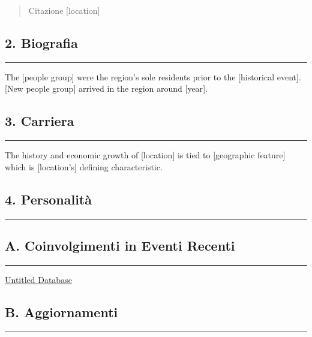 \begin{quote}
Citazione {[}location{]}
\end{quote}

\subsection{2. Biografia}\label{biografia}

\begin{center}\rule{0.5\linewidth}{0.5pt}\end{center}

The {[}people group{]} were the region's sole residents prior to the
{[}historical event{]}. {[}New people group{]} arrived in the region
around {[}year{]}.

\subsection{3. Carriera}\label{carriera}

\begin{center}\rule{0.5\linewidth}{0.5pt}\end{center}

The history and economic growth of {[}location{]} is tied to
{[}geographic feature{]} which is {[}location's{]} defining
characteristic.

\subsection{4. Personalità}\label{personalituxe0}

\begin{center}\rule{0.5\linewidth}{0.5pt}\end{center}

\subsection{A. Coinvolgimenti in Eventi
Recenti}\label{a.-coinvolgimenti-in-eventi-recenti}

\begin{center}\rule{0.5\linewidth}{0.5pt}\end{center}

\href{Untitled\%20Database\%206f27cc25cff743bf8e184fd230b80195.csv}{Untitled
Database}

\subsection{B. Aggiornamenti}\label{b.-aggiornamenti}

\begin{center}\rule{0.5\linewidth}{0.5pt}\end{center}

\href{Untitled\%2050c58d46d1764a2d91071d788209b2ad.csv}{}
